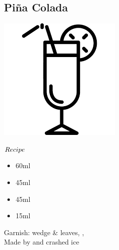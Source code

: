 \subsection{Pi\~{n}a Colada}
\vspace{-7.4mm}
\hspace{36mm}
\includegraphics[scale=.07]{cocktail_glass_tall.png}
\vspace{2.5mm}
\begin{itembox}[l]{\boldmath $Recipe$}
\begin{itemize}
\setlength{\parskip}{0cm}
\setlength{\itemsep}{0cm}
\item \lrum 60ml
\item \pj 45ml
\item \cococ 45ml
\item \limj 15ml
\end{itemize}
\vspace{-4mm}
Garnish: \pineapple wedge \& leaves,
\cherry,
\umbrella\\
Made by \shake and crashed ice
\end{itembox}
